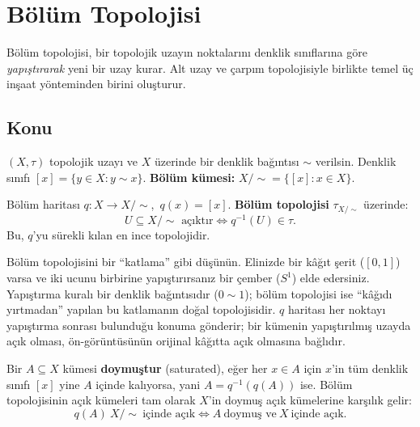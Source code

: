 \chapter{Bölüm Topolojisi}

Bölüm topolojisi, bir topolojik uzayın noktalarını denklik sınıflarına göre
\emph{yapıştırarak} yeni bir uzay kurar.
Alt uzay ve çarpım topolojisiyle birlikte temel üç inşaat yönteminden birini oluşturur.

\section{Konu}

\begin{definition}
$(X, \tau)$ topolojik uzayı ve $X$ üzerinde bir denklik bağıntısı $\sim$ verilsin.
Denklik sınıfı $[x] = \{y \in X : y \sim x\}$.
\textbf{Bölüm kümesi:} $X/{\sim} = \{[x] : x \in X\}$.
\end{definition}

\begin{definition}
Bölüm haritası $q: X \to X/{\sim}$,\ $q(x) = [x]$.
\textbf{Bölüm topolojisi} $\tau_{X/\sim}$ üzerinde:
\[
U \subseteq X/{\sim} \text{ açıktır} \iff q^{-1}(U) \in \tau.
\]
Bu, $q$'yu sürekli kılan en ince topolojidir.
\end{definition}

\begin{sezgi}
Bölüm topolojisini bir ``katlama'' gibi düşünün. Elinizde bir kâğıt şerit
($[0,1]$) varsa ve iki ucunu birbirine yapıştırırsanız bir çember ($S^1$) elde
edersiniz. Yapıştırma kuralı bir denklik bağıntısıdır ($0 \sim 1$); bölüm
topolojisi ise ``kâğıdı yırtmadan'' yapılan bu katlamanın doğal topolojisidir.
$q$ haritası her noktayı yapıştırma sonrası bulunduğu konuma gönderir; bir
kümenin yapıştırılmış uzayda açık olması, ön-görüntüsünün orijinal kâğıtta açık
olmasına bağlıdır.
\end{sezgi}

\begin{definition}
Bir $A \subseteq X$ kümesi \textbf{doymuştur} (saturated), eğer her $x \in A$
için $x$'in tüm denklik sınıfı $[x]$ yine $A$ içinde kalıyorsa, yani
$A = q^{-1}(q(A))$ ise. Bölüm topolojisinin açık kümeleri tam olarak $X$'in
doymuş açık kümelerine karşılık gelir:
\[
q(A)\ X/{\sim}\ \text{içinde açık} \iff A\ \text{doymuş ve}\ X\ \text{içinde açık.}
\]
\end{definition}

